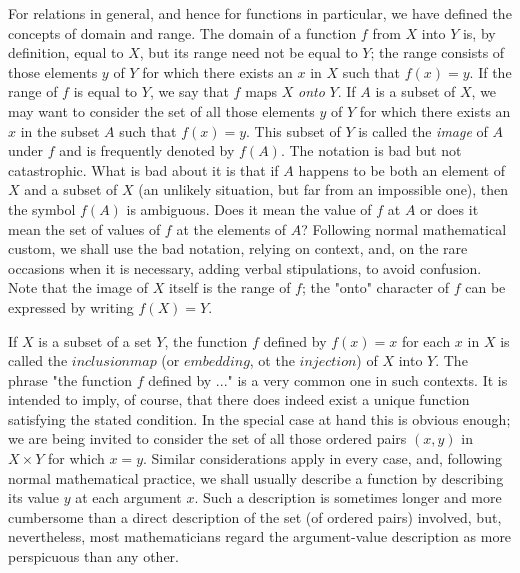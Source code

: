 For relations in general, and hence for functions in particular, we have defined the concepts of domain and range. The domain of a function $f$ from $X$ into $Y$ is, by definition, equal to $X$, but its range need not be equal to $Y$; the range consists of those elements $y$ of $Y$ for which there exists an $x$ in $X$ such that $f(x) = y$. If the range of $f$ is equal to $Y$, we say that $f$ maps $X$ \textit{onto} $Y$. If $A$ is a subset of $X$, we may want to consider the set of all those elements $y$ of $Y$ for which there exists an $x$ in the subset $A$ such that $f(x) = y$. This subset of $Y$ is called the \textit{image} of $A$ under $f$ and is frequently denoted by $f(A)$. The notation is bad but not catastrophic. What is bad about it is that if $A$ happens to be both an element of $X$ and a subset of $X$ (an unlikely situation, but far from an impossible one), then the symbol $f(A)$ is ambiguous. Does it mean the value of $f$ at $A$ or does it mean the set of values of $f$ at the elements of $A$?   Following normal mathematical custom, we shall use the bad notation, relying on context, and, on the rare occasions when it is necessary, adding verbal stipulations, to avoid confusion. Note that the image of $X$ itself is the range of $f$; the "onto" character of $f$ can be expressed by writing $f(X) = Y$. 

If $X$ is a subset of a set $Y$, the function $f$ defined by $f(x) = x$ for each $x$ in $X$ is called the $inclusion map$ (or $embedding$, ot the $injection$) of $X$ into $Y$. The phrase "the function $f$ defined by ..." is a very common one in such contexts. It is intended to imply, of course, that there does indeed exist a unique function satisfying the stated condition. In the special case at hand this is obvious enough; we are being invited to consider the set of all those ordered pairs $(x, y)$ in $X \times Y$ for which $x = y$. Similar considerations apply in every case, and, following normal mathematical practice, we shall usually describe a function by describing its value $y$ at each argument $x$. Such a description is sometimes longer and more cumbersome than a direct description of the set (of ordered pairs) involved, but, nevertheless, most mathematicians regard the argument-value description as more perspicuous than any other. 

